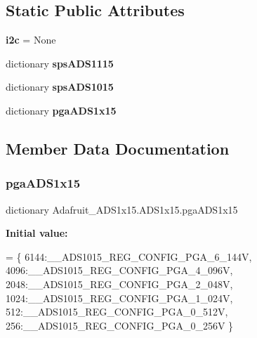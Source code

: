 \subsection*{Static Public Attributes}
\begin{DoxyCompactItemize}
\item 
\mbox{\label{classAdafruit__ADS1x15_1_1ADS1x15_a23b4600d8f5ae51f8b2b0bdab1228ccb}} 
{\bfseries i2c} = None
\item 
dictionary {\bfseries sps\+A\+D\+S1115}
\item 
dictionary {\bfseries sps\+A\+D\+S1015}
\item 
dictionary {\bfseries pga\+A\+D\+S1x15}
\end{DoxyCompactItemize}


\subsection{Member Data Documentation}
\mbox{\label{classAdafruit__ADS1x15_1_1ADS1x15_a271bf7a5172593a708f66d317447fde8}} 
\subsubsection{\texorpdfstring{pga\+A\+D\+S1x15}{pgaADS1x15}}
{\footnotesize\ttfamily dictionary Adafruit\+\_\+\+A\+D\+S1x15.\+A\+D\+S1x15.\+pga\+A\+D\+S1x15\hspace{0.3cm}{\ttfamily [static]}}

{\bfseries Initial value\+:}
\begin{DoxyCode}
=  \{
    6144:\_\_ADS1015\_REG\_CONFIG\_PGA\_6\_144V,
    4096:\_\_ADS1015\_REG\_CONFIG\_PGA\_4\_096V,
    2048:\_\_ADS1015\_REG\_CONFIG\_PGA\_2\_048V,
    1024:\_\_ADS1015\_REG\_CONFIG\_PGA\_1\_024V,
    512:\_\_ADS1015\_REG\_CONFIG\_PGA\_0\_512V,
    256:\_\_ADS1015\_REG\_CONFIG\_PGA\_0\_256V
  \}
\end{DoxyCode}
\mbox{\label{classAdafruit__ADS1x15_1_1ADS1x15_a289f25e9d180292cca4c9f9330e6a9a4}} 
